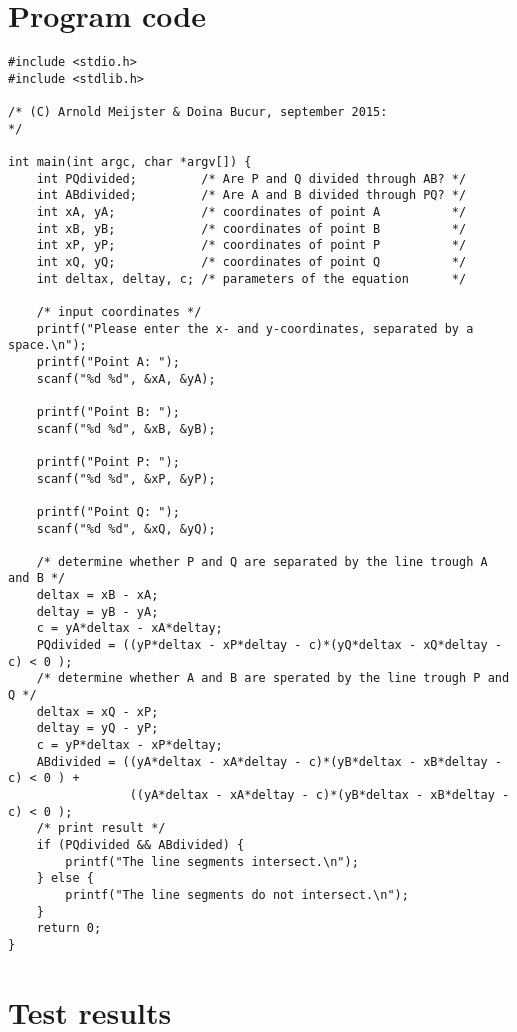 \documentclass[a4paper,10pt]{article}
\begin{document}
\section{Program code}
\begin{lstlisting}[style = code, title = parprob.c]
#include <stdio.h>
#include <stdlib.h>

/* (C) Arnold Meijster & Doina Bucur, september 2015:
*/

int main(int argc, char *argv[]) {
    int PQdivided;         /* Are P and Q divided through AB? */
    int ABdivided;         /* Are A and B divided through PQ? */
    int xA, yA;            /* coordinates of point A          */
    int xB, yB;            /* coordinates of point B          */
    int xP, yP;            /* coordinates of point P          */
    int xQ, yQ;            /* coordinates of point Q          */
    int deltax, deltay, c; /* parameters of the equation      */

    /* input coordinates */
    printf("Please enter the x- and y-coordinates, separated by a space.\n");
    printf("Point A: ");
    scanf("%d %d", &xA, &yA);

    printf("Point B: ");
    scanf("%d %d", &xB, &yB);

    printf("Point P: ");
    scanf("%d %d", &xP, &yP);

    printf("Point Q: ");
    scanf("%d %d", &xQ, &yQ);

    /* determine whether P and Q are separated by the line trough A and B */
    deltax = xB - xA;
    deltay = yB - yA;
    c = yA*deltax - xA*deltay;
    PQdivided = ((yP*deltax - xP*deltay - c)*(yQ*deltax - xQ*deltay - c) < 0 );
    /* determine whether A and B are sperated by the line trough P and Q */
    deltax = xQ - xP;
    deltay = yQ - yP;
    c = yP*deltax - xP*deltay;
    ABdivided = ((yA*deltax - xA*deltay - c)*(yB*deltax - xB*deltay - c) < 0 ) + 
                 ((yA*deltax - xA*deltay - c)*(yB*deltax - xB*deltay - c) < 0 );
    /* print result */
    if (PQdivided && ABdivided) {
        printf("The line segments intersect.\n");
    } else {
        printf("The line segments do not intersect.\n");
    }
    return 0;
}
\end{lstlisting}

\section{Test results}
\end{document}
